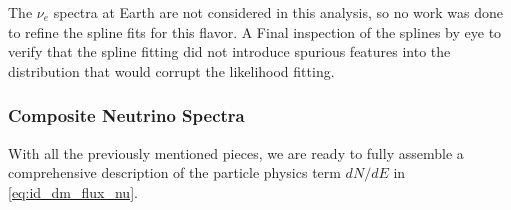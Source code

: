The $\nu_e$ spectra at Earth are not considered in this analysis, so no work was done to refine the spline fits for this flavor.
A Final inspection of the splines by eye to verify that the spline fitting did not introduce spurious features into the distribution that would corrupt the likelihood fitting.

\subsubsection{Composite Neutrino Spectra}\label{sec:icDM_composite_dNdE}

With all the previously mentioned pieces, we are ready to fully assemble a comprehensive description of the particle physics term $dN/dE$ in \cref{eq:id_dm_flux_nu}.
\nuIDDMFlux

